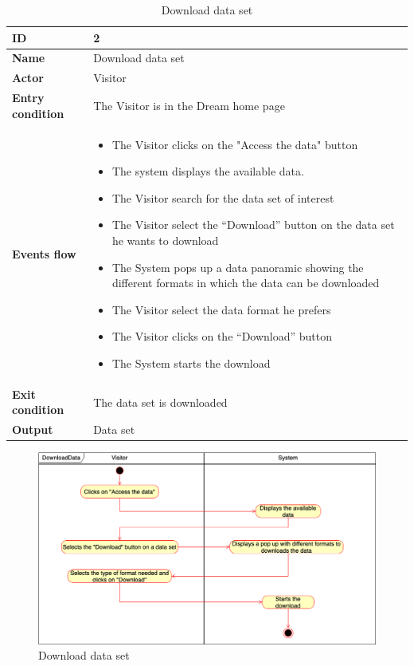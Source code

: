     \FloatBarrier
    \begin{longtable}{p{} | p{}}
    \caption{Download data set}
    \label{tab:download_dataset}\\
        \hline
        \textbf{ID} & 2\\
        \hline
        \textbf{Name}  &  Download data set\\
        \hline
        \textbf{Actor}  &  Visitor\\
        \hline
        \textbf{Entry condition}  &  The Visitor is in the Dream home page\\
        \hline
        \textbf{Events flow} & \begin{itemize}
                \item The Visitor clicks on the "Access the data" button
                \item The system displays the available data.
                \item The Visitor search for the data set of interest
                \item The Visitor select the “Download” button on the data set he wants to download
                \item The System pops up a data panoramic showing the different formats in which the data can be downloaded
                \item The Visitor select the data format he prefers
                \item The Visitor clicks on the “Download” button
                \item The System starts the download

                \end{itemize}
                 \\
        \hline
        \textbf{Exit condition} &  The data set is downloaded\\
        \hline
        \textbf{Output} & Data set\\
        \hline
    
    \end{longtable}
    \newpage
\begin{figure}[h!]
        \centering
        \includegraphics[scale=0.30]{images/use_cases_diagram/visitor_download_dataset.png}
        \caption{Download data set}
        \label{fig:download_data}
    \end{figure}
    \FloatBarrier
    
